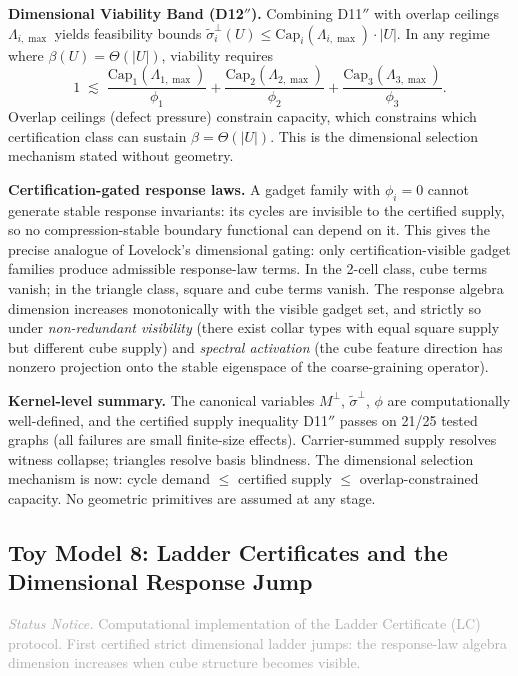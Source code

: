 \documentclass[11pt,a4paper]{article}
\theoremstyle{definition}
\theoremstyle{remark}
\newcommand{\statusnotice}[1]{%
  \medskip\noindent\textcolor{darkgray}{\textit{Status Notice.} #1}\medskip
}
\begin{document}
\textbf{Dimensional Viability Band (D12$''$).} Combining D11$''$ with overlap ceilings $\Lambda_{i,\max}$ yields feasibility bounds $\tilde\sigma_i^\perp(U) \leq \mathrm{Cap}_i(\Lambda_{i,\max}) \cdot |U|$. In any regime where $\beta(U) = \Theta(|U|)$, viability requires
\[
1 \;\lesssim\; \frac{\mathrm{Cap}_1(\Lambda_{1,\max})}{\phi_1} + \frac{\mathrm{Cap}_2(\Lambda_{2,\max})}{\phi_2} + \frac{\mathrm{Cap}_3(\Lambda_{3,\max})}{\phi_3}.
\]
Overlap ceilings (defect pressure) constrain capacity, which constrains which certification class can sustain $\beta = \Theta(|U|)$. This is the dimensional selection mechanism stated without geometry.

\textbf{Certification-gated response laws.} A gadget family with $\phi_i = 0$ cannot generate stable response invariants: its cycles are invisible to the certified supply, so no compression-stable boundary functional can depend on it. This gives the precise analogue of Lovelock's dimensional gating: only certification-visible gadget families produce admissible response-law terms. In the 2-cell class, cube terms vanish; in the triangle class, square and cube terms vanish. The response algebra dimension increases monotonically with the visible gadget set, and strictly so under \emph{non-redundant visibility} (there exist collar types with equal square supply but different cube supply) and \emph{spectral activation} (the cube feature direction has nonzero projection onto the stable eigenspace of the coarse-graining operator).

\textbf{Kernel-level summary.} The canonical variables $M^\perp$, $\tilde\sigma^\perp$, $\phi$ are computationally well-defined, and the certified supply inequality D11$''$ passes on 21/25 tested graphs (all failures are small finite-size effects). Carrier-summed supply resolves witness collapse; triangles resolve basis blindness. The dimensional selection mechanism is now: cycle demand $\leq$ certified supply $\leq$ overlap-constrained capacity. No geometric primitives are assumed at any stage.


\subsection{Toy Model 8: Ladder Certificates and the Dimensional Response Jump}\label{app:toymodel8}

\statusnotice{Computational implementation of the Ladder Certificate (LC) protocol. First certified strict dimensional ladder jumps: the response-law algebra dimension increases when cube structure becomes visible.}
\end{document}
